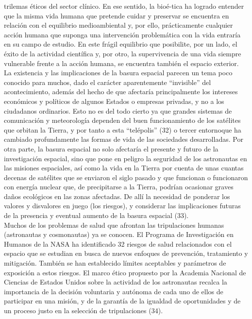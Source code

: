 \documentclass[12pt,letterpaper]{article}
\begin{document}
\pagestyle{fancy}
        \fancyhf{}
        \rhead{}
\begin{multicols}{2}
\noindent trilemas éticos del sector clínico. En ese sentido, la bioé-tica ha logrado entender que la misma vida humana que pretende cuidar y preservar se encuentra en relación con el equilibrio medioambiental y, por ello, prácticamente cualquier acción humana que suponga una intervención problemática con la vida entraría en su campo de estudio. En este frágil equilibrio que posibilite, por un lado, el éxito de la actividad científica y, por otro, la supervivencia de una vida siempre vulnerable frente a la acción humana, se encuentra también el espacio exterior.
\\

\noindent La existencia y las implicaciones de la basura espacial parecen un tema poco conocido para muchos, dado el carácter aparentemente “invisible” del acontecimiento, además del hecho de que afectaría principalmente los intereses económicos y políticos de algunos Estados o empresas  privadas,  y  no  a  los  ciudadanos  ordinarios.  Esto  no  es  del  todo  cierto  ya  que  grandes  sistemas  de  comunicación  y  meteorología  dependen  del  buen  funcionamiento  de  los  satélites  que  orbitan  la  Tierra,  y por tanto a esta “telépolis” (32) o tercer entornoque ha cambiado profundamente las formas de vida de las sociedades desarrolladas. Por otra parte, la basura espacial no solo afectaría el presente y futuro de la investigación espacial, sino que pone en peligro la seguridad de los astronautas en las misiones espaciales, así como la vida en  la  Tierra  por  cuenta  de  unas  cuantas  decenas  de  satélites que se enviaron el siglo pasado y que funcionan o funcionaron con energía nuclear que, de precipitarse a la Tierra, podrían ocasionar graves daños ecológicos en las zonas afectadas. De allí la necesidad de ponderar los valores y disvalores en juego (los riesgos), y considerar las  implicaciones  futuras  de  la  presencia  y  eventual  aumento de la basura espacial (33).
\\

\noindent Muchos  de  los  problemas  de  salud  que  afrontan  las  tripulaciones humanas (astronautas y cosmonautas) ya se conocen. El Programa de Investigación en Humanos de la NASA ha identificado 32 riesgos de salud relacionados con el espacio que se estudian en busca de nuevos enfoques de  prevención,  tratamiento  y  mitigación.  También  se  han  establecido  límites  aceptables  y  parámetros  de  exposición a estos riesgos. El marco ético propuesto por la Academia Nacional de Ciencias de Estados Unidos sobre la actividad de los astronautas recalca la importancia de  la  decisión  voluntaria  y  autónoma  de  cada  uno  de  ellos de participar en una misión, y de la garantía de la igualdad de oportunidades y de un proceso justo en la selección de tripulaciones (34).

\end{multicols}
\end{document}
